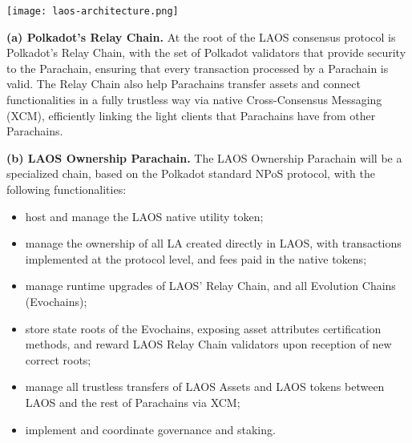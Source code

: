 \begin{Figure}
    \medskip
    \texttt{[image: laos-architecture.png]}
    \medskip
    \label{fig:architecture}
\end{Figure}

\vspace{\baselineskip}

{\bf (a) Polkadot's Relay Chain.}
At the root of the LAOS consensus protocol is Polkadot's Relay Chain, with the set 
of Polkadot validators that provide security to the Parachain, ensuring that
every transaction processed by a Parachain is valid. The Relay Chain
also help Parachains transfer assets and connect functionalities in a fully
trustless way via native Cross-Consensus Messaging (XCM), efficiently 
linking the light clients that Parachains have from other Parachains.

\vspace{\baselineskip}

{\bf (b) LAOS Ownership Parachain.}
The LAOS Ownership Parachain will be a specialized chain, based on the 
Polkadot standard NPoS protocol, with the following functionalities:
\begin{itemize}
    \item host and manage the LAOS native utility token;
    \item manage the ownership of all LA created directly in LAOS, with 
    transactions implemented at the protocol level,
    and fees paid in the native tokens;
    \item manage runtime upgrades of LAOS' Relay Chain, and all Evolution Chains (Evochains);
    \item store state roots of the Evochains, exposing asset attributes
    certification methods,
    and reward LAOS Relay Chain validators upon reception of new correct roots;
    \item manage all trustless transfers of LAOS Assets and LAOS tokens
    between LAOS and the rest of Parachains via XCM;
    \item implement and coordinate governance and staking.
\end{itemize}

